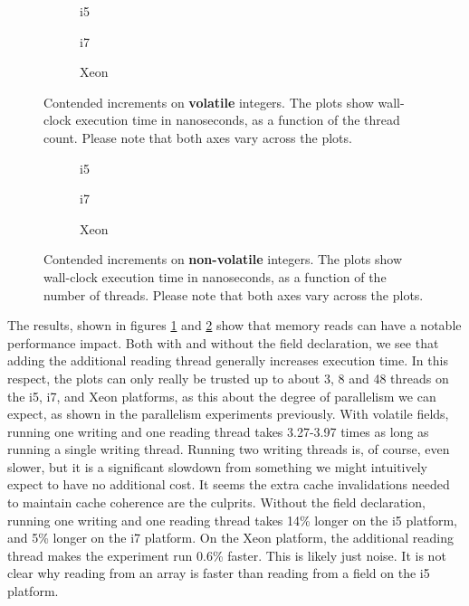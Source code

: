 \begin{figure}[hbpt]
	\graphicspath{{plots/}}
	\begin{subfigure}{0.5\textwidth}
		
		\caption{i5}
	\end{subfigure}
	\begin{subfigure}{0.5\textwidth}
		
		\caption{i7}
	\end{subfigure}
	\begin{subfigure}{1\textwidth}
		
		\caption{Xeon}
	\end{subfigure}
	\caption{Contended increments on \textbf{volatile} integers. The plots show
	wall-clock execution time in nanoseconds, as a function of the thread count.
	Please note that both axes vary across the plots.}
	\label{fig:cont}
\end{figure}

\begin{figure}[hbpt]
	\graphicspath{{plots/}}
	\begin{subfigure}{0.5\textwidth}
		
		\caption{i5}
	\end{subfigure}
	\begin{subfigure}{0.5\textwidth}
		
		\caption{i7}
	\end{subfigure}
	\begin{subfigure}{1\textwidth}
		
		\caption{Xeon}
	\end{subfigure}
	\caption{Contended increments on \textbf{non-volatile} integers. The
	plots show wall-clock execution time in nanoseconds, as a function of the number of
	threads. Please note that both axes vary across the plots.}
	\label{fig:cont-nob}
\end{figure}

The results, shown in figures \ref{fig:cont} and \ref{fig:cont-nob} show that
memory reads can have a notable performance impact. Both with and without the
 field declaration, we see that adding the additional reading
thread generally increases execution time. In this respect, the plots can only
really be trusted up to about 3, 8 and 48 threads on the i5, i7, and Xeon
platforms, as this about the degree of parallelism we can expect, as shown in
the parallelism experiments previously. With volatile fields, running one
writing and one reading thread takes 3.27-3.97 times as long as running a single
writing thread. Running two writing threads is, of course, even slower, but it
is a significant slowdown from something we might intuitively expect to have no
additional cost. It seems the extra cache invalidations needed to maintain cache
coherence are the culprits. Without the  field declaration,
running one writing and one reading thread takes 14\% longer on the i5 platform,
and 5\% longer on the i7 platform. On the Xeon platform, the additional reading
thread makes the experiment run 0.6\% faster. This is likely just noise. It is
not clear why reading from an array is faster than reading from a field on the
i5 platform.


